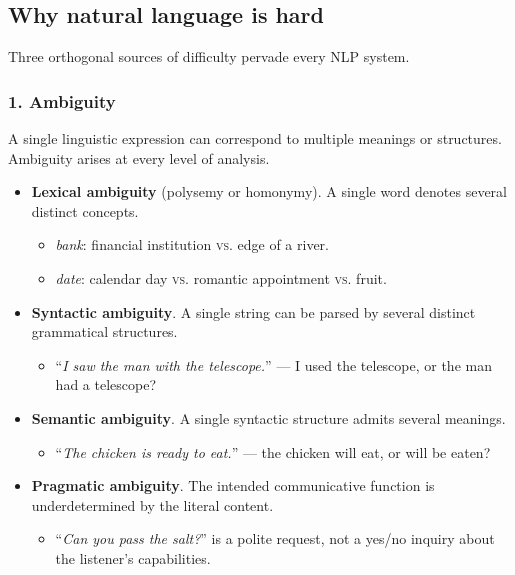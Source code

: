 \documentclass[12pt,a4paper]{report}
\theoremstyle{definition}
\theoremstyle{remark}
\begin{document}
\subsection{Why natural language is hard}

Three orthogonal sources of difficulty pervade every NLP system.

\subsubsection*{1. Ambiguity}

A single linguistic expression can correspond to multiple meanings or structures. Ambiguity arises at every level of analysis.

\begin{itemize}
    \item \textbf{Lexical ambiguity} (polysemy or homonymy). A single word denotes several distinct concepts.
    \begin{itemize}
        \item \emph{bank}: financial institution \textsc{vs.} edge of a river.
        \item \emph{date}: calendar day \textsc{vs.} romantic appointment \textsc{vs.} fruit.
    \end{itemize}
    \item \textbf{Syntactic ambiguity}. A single string can be parsed by several distinct grammatical structures.
    \begin{itemize}
        \item ``\emph{I saw the man with the telescope.}'' --- I used the telescope, or the man had a telescope?
    \end{itemize}
    \item \textbf{Semantic ambiguity}. A single syntactic structure admits several meanings.
    \begin{itemize}
        \item ``\emph{The chicken is ready to eat.}'' --- the chicken will eat, or will be eaten?
    \end{itemize}
    \item \textbf{Pragmatic ambiguity}. The intended communicative function is underdetermined by the literal content.
    \begin{itemize}
        \item ``\emph{Can you pass the salt?}'' is a polite request, not a yes/no inquiry about the listener's capabilities.
    \end{itemize}
\end{itemize}
\end{document}
